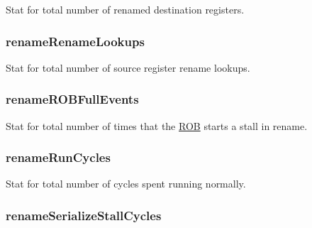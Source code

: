 \label{classDefaultRename_a3e2c435288350f7d805557b4d1a2b7a5}
Stat for total number of renamed destination registers. \hypertarget{classDefaultRename_ab0b7632e67fcf2fe1e6bb1cef111eda4}{
\subsubsection[{renameRenameLookups}]{ {\bf renameRenameLookups}}}
\label{classDefaultRename_ab0b7632e67fcf2fe1e6bb1cef111eda4}
Stat for total number of source register rename lookups. \hypertarget{classDefaultRename_a41408b25638b2531bc9e3b6ee622d148}{
\subsubsection[{renameROBFullEvents}]{ {\bf renameROBFullEvents}}}
\label{classDefaultRename_a41408b25638b2531bc9e3b6ee622d148}
Stat for total number of times that the \hyperlink{classROB}{ROB} starts a stall in rename. \hypertarget{classDefaultRename_a7dd03c8b7a88da84ff7e1bdd6b938d47}{
\subsubsection[{renameRunCycles}]{ {\bf renameRunCycles}}}
\label{classDefaultRename_a7dd03c8b7a88da84ff7e1bdd6b938d47}
Stat for total number of cycles spent running normally. \hypertarget{classDefaultRename_a712d72379bc583c374e2f6179e8ee58f}{
\subsubsection[{renameSerializeStallCycles}]{ {\bf renameSerializeStallCycles}}}
